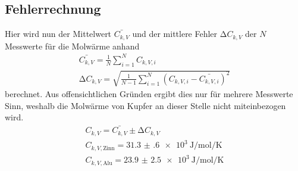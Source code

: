 \subsection{Fehlerrechnung}
Hier wird nun der Mittelwert $\bar{C_{k,V}}$ und der mittlere Fehler $\increment C_{k,V}$ der $N$ Messwerte für die Molwärme anhand 
\begin{gather}
\bar{C_{k,V}}=\frac{1}{N} \sum_{i=1}^N C_{k,V,i} \\
\increment C_{k,V} = \sqrt{\frac{1}{N-1}\sum_{i=1}^N (C_{k,V,i}-\bar{C_{k,V,i}})^2 }
\end{gather}
berechnet.
Aus offensichtlichen Gründen ergibt dies nur für mehrere Messwerte Sinn, weshalb die Molwärme von Kupfer an dieser Stelle nicht miteinbezogen wird.
\begin{gather*}
C_{k,V}=\bar{C_{k,V}} \pm \increment C_{k,V} \\
C_{k,V,\text{Zinn}} = \SI{31.3(6)e3}{\joule\per\mol\per\kelvin} \\
C_{k,V,\text{Alu}} = \SI{23.9(25)e3}{\joule\per\mol\per\kelvin} %
\end{gather*}
